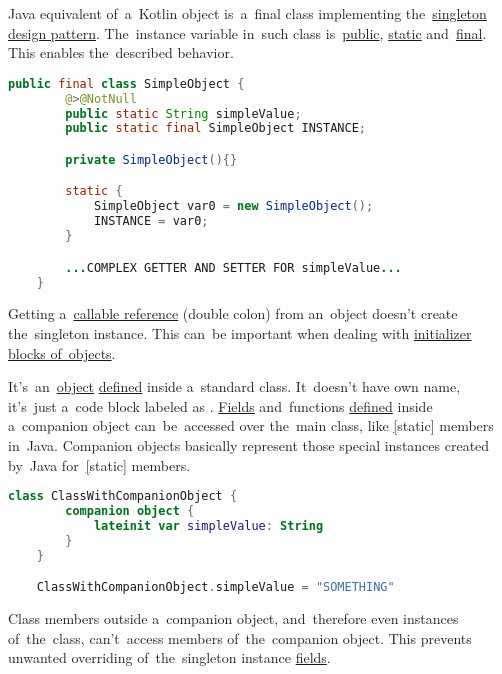 \noindent Java equivalent of~a~Kotlin object is~a~final class implementing the~\hyperref[singletondp]{singleton design pattern}.
The~instance variable in~such class is~\hyperref[javapublic]{public}, \hyperref[javastatic]{static} and~\hyperref[javafinal]{final}.
This enables the~described behavior.
\newpage

\begin{lstlisting}[language=Java]
    public final class SimpleObject {
        @>@NotNull
        public static String simpleValue;
        public static final SimpleObject INSTANCE;

        private SimpleObject(){}

        static {
            SimpleObject var0 = new SimpleObject();
            INSTANCE = var0;
        }

        ...COMPLEX GETTER AND SETTER FOR simpleValue...
    }
\end{lstlisting}

\warning Getting a~\hyperref[kotlincallablereference]{callable reference} (double colon) from an~object doesn't create the~singleton instance.
This can~be important when dealing with \hyperref[objectinitblock]{initializer blocks of~objects}.

\label{companionobject}
It's~an~\hyperref[kotlinobject]{object} \hyperref[declarationdefinition]{defined} inside a~standard class.
It~doesn't have own name, it's~just a~code block labeled as .
\hyperref[variablefieldproperty]{Fields} and~functions \hyperref[declarationdefinition]{defined} inside a~companion object can~be~accessed over the~main class, like \hyperref[javastatic][static] members in~Java.
Companion objects basically represent those special instances created by~Java for~\hyperref[javastatic][static] members.

\begin{lstlisting}[language=Kotlin]
    class ClassWithCompanionObject {
        companion object {
            lateinit var simpleValue: String
        }
    }

    ClassWithCompanionObject.simpleValue = "SOMETHING"
\end{lstlisting}

\note Class members outside a~companion object, and~therefore even instances of~the~class, can't~access members of~the~companion object.
This prevents unwanted overriding of~the~singleton instance \hyperref[variablefieldproperty]{fields}.

